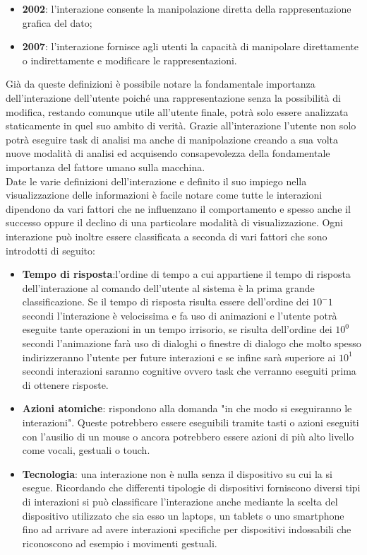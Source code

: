 {\begin{itemize}
	\item \textbf{2002}: l’interazione consente la manipolazione diretta della rappresentazione grafica del dato;
	\item \textbf{2007}: l’interazione fornisce agli utenti la capacità di manipolare direttamente o indirettamente e modificare le rappresentazioni.
\end{itemize}
Già da queste definizioni è possibile notare la fondamentale importanza dell'interazione dell'utente poiché una rappresentazione senza la possibilità di modifica, restando comunque utile all'utente finale, potrà solo essere analizzata staticamente in quel suo ambito di verità. Grazie all'interazione l'utente non solo potrà eseguire task di analisi ma anche di manipolazione creando a sua volta nuove modalità di analisi ed acquisendo consapevolezza della fondamentale importanza del fattore umano sulla macchina.\\
Date le varie definizioni dell'interazione e definito il suo impiego nella visualizzazione delle informazioni è facile notare come tutte le interazioni dipendono da vari fattori che ne influenzano il comportamento e spesso anche il successo oppure il declino di una particolare modalità di visualizzazione.
Ogni interazione può inoltre essere classificata a seconda di vari fattori che sono introdotti di seguito:
\begin{itemize}
	\item \textbf{Tempo di risposta}:l'ordine di tempo a cui appartiene il tempo di risposta dell'interazione al comando dell'utente al sistema è la prima grande classificazione. Se il tempo di risposta risulta essere dell'ordine  dei $10^-1$ secondi l’interazione è velocissima e fa uso di animazioni e l'utente potrà eseguite tante operazioni in un tempo irrisorio, se risulta dell'ordine dei $10^0$ secondi l'animazione farà uso di dialoghi o finestre di dialogo che molto spesso indirizzeranno l'utente per future interazioni e se infine sarà superiore ai $10^1$ secondi interazioni saranno cognitive ovvero task che verranno eseguiti prima di ottenere risposte.
	\item \textbf{Azioni atomiche}: rispondono alla domanda "in che modo si eseguiranno le interazioni". Queste potrebbero essere eseguibili tramite tasti o azioni eseguiti con l'ausilio di un mouse o ancora potrebbero essere azioni di più alto livello come vocali, gestuali o touch.
	\item \textbf{Tecnologia}: una interazione non è nulla senza il dispositivo su cui la si esegue. Ricordando che differenti tipologie di dispositivi forniscono diversi tipi di interazioni si può classificare l'interazione anche mediante la scelta del dispositivo utilizzato che sia esso un laptops, un tablets o uno smartphone fino ad arrivare ad avere interazioni specifiche per dispositivi indossabili che riconoscono ad esempio i movimenti gestuali.

\end{itemize}}

